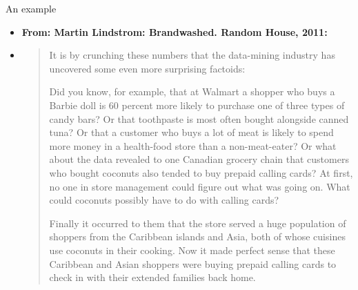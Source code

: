 \documentclass[aspectratio=169,t]{beamer}
\begin{document}
  { 
    \begin{frame}{An example}
        \begin{itemize}
            \item \textbf{From: Martin Lindstrom: Brandwashed. Random House, 2011:}
            \item \begin{quote}
            It is by crunching these numbers that the data-mining industry has uncovered some even more surprising factoids:

            Did you know, for example, that at Walmart a shopper who buys a Barbie doll is 60 percent more likely to purchase one of three types of candy bars? Or that toothpaste is most often bought alongside canned tuna? Or that a customer who buys a lot of meat is likely to spend more money in a health-food store than a non-meat-eater? Or what about the data revealed to one Canadian grocery chain that customers who bought coconuts also tended to buy prepaid calling cards? At first, no one in store management could figure out what was going on. What could coconuts possibly have to do with calling cards?

            Finally it occurred to them that the store served a huge population of shoppers from the Caribbean islands and Asia, both of whose cuisines use coconuts in their cooking. Now it made perfect sense that these Caribbean and Asian shoppers were buying prepaid calling cards to check in with their extended families back home.
            \end{quote}
        \end{itemize}
    \end{frame}
  }
\end{document}
